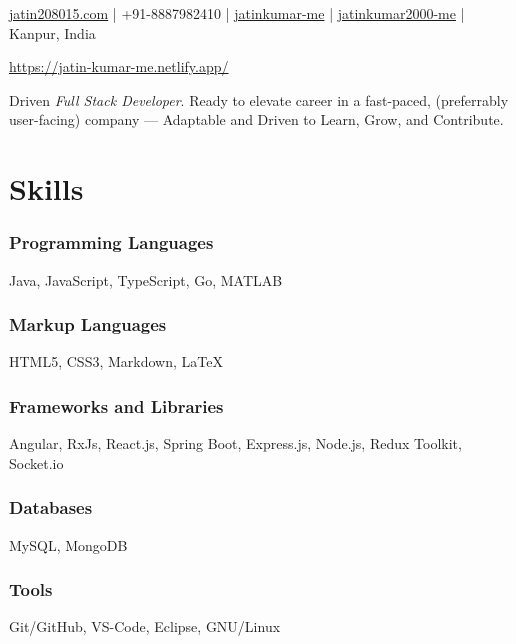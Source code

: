 \documentclass[a4paper]{article}
\author{Jatin Kumar}
\begin{document}
\begin{center}
	\makeatletter
	\centering {\huge \@author}
	\makeatother
	\vspace{6pt}

	\href{mailto:jatin208015\@gmail.com}{{\faAt} jatin208015\@gmail.com} |
	{\faPhone } +91-8887982410 |
	\href{https://github.com/jatinkumar-me}{{\faGithub} jatinkumar-me} |
	\href{https://www.linkedin.com/in/jatinkumar-2000-me/}{{\faLinkedin} {jatinkumar2000-me}} |
	{\faMapMarker} Kanpur, India

	\href{https://jatin-kumar-me.netlify.app/}{{\faGlobe} https://jatin-kumar-me.netlify.app/}
\end{center}

\vspace{-13pt}
\hrulefill
\vspace{-8pt}

\begin{center}
Driven \textit{Full Stack Developer}. Ready to elevate career in a fast-paced, (preferrably user-facing) company — Adaptable and Driven to Learn, Grow, and Contribute.
\end{center}

\section{Skills}
\subsubsection*{Programming Languages}
Java, JavaScript, TypeScript, Go, MATLAB
\vspace{-10pt}
\subsubsection*{Markup Languages}
HTML5, CSS3, Markdown, \LaTeX
\vspace{-10pt}
\subsubsection*{Frameworks and Libraries}
Angular, RxJs, React.js, Spring Boot, Express.js, Node.js, Redux Toolkit, Socket.io
\vspace{-10pt}
\subsubsection*{Databases}
MySQL, MongoDB
\vspace{-10pt}
\subsubsection*{Tools}
Git/GitHub, VS-Code, Eclipse, GNU/Linux
\end{document}
